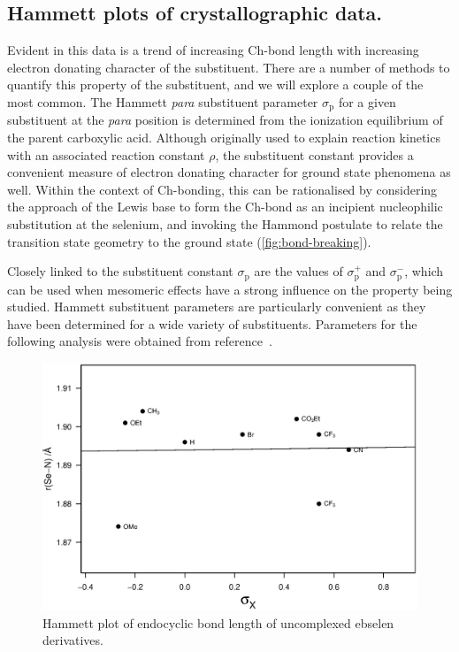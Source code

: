 \begin{refsection}
\subsection{Hammett plots of crystallographic data.}
Evident in this data is a trend of increasing Ch-bond length with increasing electron donating character of the substituent.
There are a number of methods to quantify this property of the substituent, and we will explore a couple of the most common.
The Hammett \textit{para} substituent parameter $ \sigma_\text{p} $ for a given substituent at the \textit{para} position is determined from the ionization equilibrium of the parent carboxylic acid.
Although originally used to explain reaction kinetics with an associated reaction constant $\rho$, the substituent constant provides a convenient measure of electron donating character for ground state phenomena as well.
Within the context of Ch-bonding, this can be rationalised by considering the approach of the Lewis base to form the Ch-bond as an incipient nucleophilic substitution at the selenium, and invoking the Hammond postulate to relate the transition state geometry to the ground state (\cref{fig:bond-breaking}).

Closely linked to the substituent constant $ \sigma_\text{p} $ are the values of $\sigma_\text{p}^{+}$ and $\sigma_\text{p}^{-}$, which can be used when mesomeric effects have a strong influence on the property being studied.
Hammett substituent parameters are particularly convenient as they have been determined for a wide variety of substituents.
Parameters for the following analysis were obtained from reference~\cite{Hansch1991}.

\begin{figure}
    \centering
    \includegraphics[width=0.9\linewidth]{Figures/hammett-endo-free.eps}
    \caption{Hammett plot of endocyclic  bond length of uncomplexed ebselen derivatives.}\label{fig:hammett-endo-free}
\end{figure}


\end{refsection}
